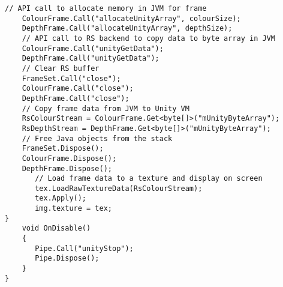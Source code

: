 \begin{appendices}
\begin{lstlisting}[style=CSharpStyle]
    // API call to allocate memory in JVM for frame
    ColourFrame.Call("allocateUnityArray", colourSize);
    DepthFrame.Call("allocateUnityArray", depthSize);
    // API call to RS backend to copy data to byte array in JVM
    ColourFrame.Call("unityGetData");
    DepthFrame.Call("unityGetData");
    // Clear RS buffer
    FrameSet.Call("close");
    ColourFrame.Call("close");
    DepthFrame.Call("close");
    // Copy frame data from JVM to Unity VM
    RsColourStream = ColourFrame.Get<byte[]>("mUnityByteArray");
    RsDepthStream = DepthFrame.Get<byte[]>("mUnityByteArray");
    // Free Java objects from the stack
    FrameSet.Dispose();
    ColourFrame.Dispose();
    DepthFrame.Dispose();
       // Load frame data to a texture and display on screen
       tex.LoadRawTextureData(RsColourStream);
       tex.Apply();
       img.texture = tex;
}
    void OnDisable()
    {
       Pipe.Call("unityStop");
       Pipe.Dispose();
    }
}\end{lstlisting}    
\end{appendices}   